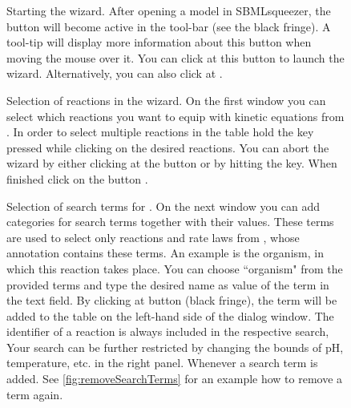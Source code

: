 \begin{figure}[t]
\caption[Starting the \SABIO wizard]{Starting the \SABIO wizard.
After opening a model in SBMLsqueezer, the \SABIO button will become active in the tool-bar (see the black fringe).
A tool-tip will display more information about this button when moving the mouse over it.
You can click at this button to launch the \SABIO wizard.
Alternatively, you can also click at .}
\label{fig:startAutomatic}
\end{figure}
\begin{figure}[t!]
\caption[Selection of reactions in the \SABIO wizard]{Selection of reactions in the \SABIO wizard.
On the first window you can select which reactions you want to equip with kinetic equations from \SABIO. 
In order to select multiple reactions in the table hold the \keys{\ctrlwin} key pressed while clicking on the desired reactions.
You can abort the wizard by either clicking at the  button or by hitting the \keys{\escwin} key.
When finished click on the button .
}
\label{fig:selectReations}
\end{figure}
\begin{figure}[t!]
\caption[Selection of search terms for \SABIO]{Selection of search terms for \SABIO.
On the next window you can add categories for search terms together with their values.
These terms are used to select only reactions and rate laws from \SABIO, whose annotation contains these terms.
An example is the organism, in which this reaction takes place.
You can choose ``organism" from the provided terms and type the desired name as value of the term in the text field.
By clicking at button  (black fringe), the term will be added to the table on the left-hand side of the dialog window.
The \KEGG identifier of a reaction is always included in the respective search, 
Your search can be further restricted by changing the bounds of pH, temperature, etc. in the right panel.
Whenever a search term is added.
See \vref{fig:removeSearchTerms} for an example how to remove a term again.}
\label{fig:searchTerms}
\end{figure}
